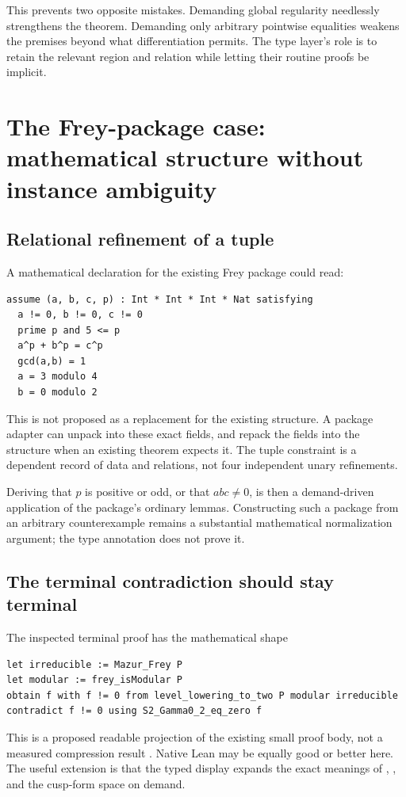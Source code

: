 \documentclass[11pt,a4paper]{article}
\newcommand{\code}[1]{\texttt{\detokenize{#1}}}
\theoremstyle{definition}
\begin{document}
This prevents two opposite mistakes. Demanding global regularity needlessly
strengthens the theorem. Demanding only arbitrary pointwise equalities weakens
the premises beyond what differentiation permits. The type layer's role is to
retain the relevant region and relation while letting their routine proofs be
implicit.

\section{The Frey-package case: mathematical structure without instance ambiguity}\label{sec:flt}
\subsection{Relational refinement of a tuple}
A mathematical declaration for the existing Frey package could read:
\begin{lstlisting}
assume (a, b, c, p) : Int * Int * Int * Nat satisfying
  a != 0, b != 0, c != 0
  prime p and 5 <= p
  a^p + b^p = c^p
  gcd(a,b) = 1
  a = 3 modulo 4
  b = 0 modulo 2
\end{lstlisting}
This is not proposed as a replacement for the existing structure. A package
adapter can unpack \code{P : FreyPackage} into these exact fields, and repack
the fields into the structure when an existing theorem expects it. The tuple
constraint is a dependent record of data and relations, not four independent
unary refinements.

Deriving that $p$ is positive or odd, or that $abc\ne0$, is then a demand-driven
application of the package's ordinary lemmas. Constructing such a package from
an arbitrary counterexample remains a substantial mathematical normalization
argument; the type annotation does not prove it.

\subsection{The terminal contradiction should stay terminal}
The inspected terminal proof has the mathematical shape
\begin{lstlisting}
let irreducible := Mazur_Frey P
let modular := frey_isModular P
obtain f with f != 0 from level_lowering_to_two P modular irreducible
contradict f != 0 using S2_Gamma0_2_eq_zero f
\end{lstlisting}
This is a proposed readable projection of the existing small proof body, not
a measured compression result \cite{fltend}. Native Lean may be equally good
or better here. The useful extension is that the typed display expands the
exact meanings of \code{irreducible}, \code{modular}, and the cusp-form space
on demand.
\end{document}
